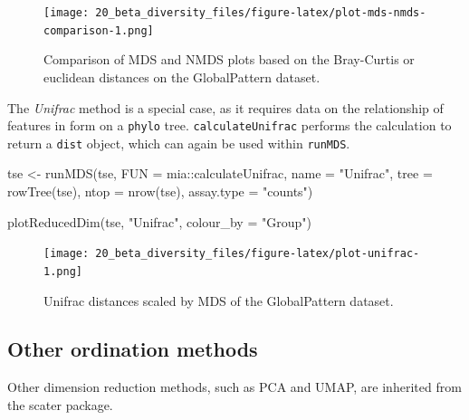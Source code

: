 \documentclass[
]{book}
\newenvironment{Shaded}{\begin{snugshade}}{\end{snugshade}}
\newcommand{\AttributeTok}[1]{\textcolor[rgb]{0.77,0.63,0.00}{#1}}
\newcommand{\FunctionTok}[1]{\textcolor[rgb]{0.00,0.00,0.00}{#1}}
\newcommand{\NormalTok}[1]{#1}
\newcommand{\OtherTok}[1]{\textcolor[rgb]{0.56,0.35,0.01}{#1}}
\newcommand{\SpecialCharTok}[1]{\textcolor[rgb]{0.00,0.00,0.00}{#1}}
\newcommand{\StringTok}[1]{\textcolor[rgb]{0.31,0.60,0.02}{#1}}
\begin{document}
\begin{figure}
\centering
\texttt{[image: 20\_beta\_diversity\_files/figure-latex/plot-mds-nmds-comparison-1.png]}
\caption{\label{fig:plot-mds-nmds-comparison}Comparison of MDS and NMDS plots based on the Bray-Curtis or euclidean distances on the GlobalPattern dataset.}
\end{figure}

The \emph{Unifrac} method is a special case, as it requires data on the
relationship of features in form on a \texttt{phylo} tree. \texttt{calculateUnifrac}
performs the calculation to return a \texttt{dist} object, which can again be
used within \texttt{runMDS}.

\begin{Shaded}
\begin{Highlighting}[]
\NormalTok{tse }\OtherTok{\textless{}{-}} \FunctionTok{runMDS}\NormalTok{(tse,}
              \AttributeTok{FUN =}\NormalTok{ mia}\SpecialCharTok{::}\NormalTok{calculateUnifrac,}
              \AttributeTok{name =} \StringTok{"Unifrac"}\NormalTok{,}
              \AttributeTok{tree =} \FunctionTok{rowTree}\NormalTok{(tse),}
              \AttributeTok{ntop =} \FunctionTok{nrow}\NormalTok{(tse),}
              \AttributeTok{assay.type =} \StringTok{"counts"}\NormalTok{)}
\end{Highlighting}
\end{Shaded}

\begin{Shaded}
\begin{Highlighting}[]
\FunctionTok{plotReducedDim}\NormalTok{(tse, }\StringTok{"Unifrac"}\NormalTok{,}
               \AttributeTok{colour\_by =} \StringTok{"Group"}\NormalTok{)}
\end{Highlighting}
\end{Shaded}

\begin{figure}
\centering
\texttt{[image: 20\_beta\_diversity\_files/figure-latex/plot-unifrac-1.png]}
\caption{\label{fig:plot-unifrac}Unifrac distances scaled by MDS of the GlobalPattern dataset.}
\end{figure}

\hypertarget{other-ord-methods}{%
\subsection{Other ordination methods}\label{other-ord-methods}}

Other dimension reduction methods, such as PCA and UMAP, are inherited from the
scater package.
\end{document}
